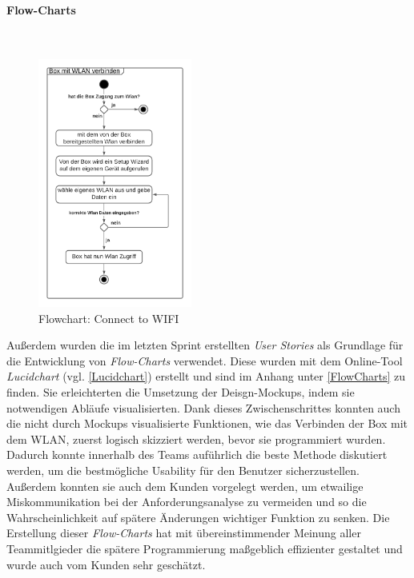 \documentclass[10pt, a4paper]{article}
\begin{document}
\paragraph*{Flow-Charts} $~$ \\
\begin{figure}
  \includegraphics[width=0.45\textwidth]{ConnectToWIFI.png}
  \caption{Flowchart: Connect to WIFI}
  \label{fig:ConnectToWifi}
\end{figure}
Außerdem wurden die im letzten Sprint erstellten \textit{User Stories} als Grundlage für die Entwicklung von \textit{Flow-Charts} verwendet.
Diese wurden mit dem Online-Tool \textit{Lucidchart} (vgl. \ref*{Lucidchart}) erstellt und sind im Anhang unter \ref*{FlowCharts} zu finden.
Sie erleichterten die Umsetzung der Deisgn-Mockups, indem sie notwendigen Abläufe visualisierten.
Dank dieses Zwischenschrittes konnten auch die nicht durch Mockups visualisierte Funktionen, wie das Verbinden der Box mit dem WLAN, zuerst logisch skizziert
werden, bevor sie programmiert wurden. Dadurch konnte innerhalb des Teams auführlich die beste Methode diskutiert werden, um die bestmögliche Usability
für den Benutzer sicherzustellen. Außerdem konnten sie auch dem Kunden vorgelegt werden, um etwailige Miskommunikation bei der Anforderungsanalyse zu vermeiden
und so die Wahrscheinlichkeit auf spätere Änderungen wichtiger Funktion zu senken. Die Erstellung dieser \textit{Flow-Charts} hat mit übereinstimmender
Meinung aller Teammitlgieder die spätere Programmierung maßgeblich effizienter gestaltet und wurde auch vom Kunden sehr geschätzt.
\end{document}
